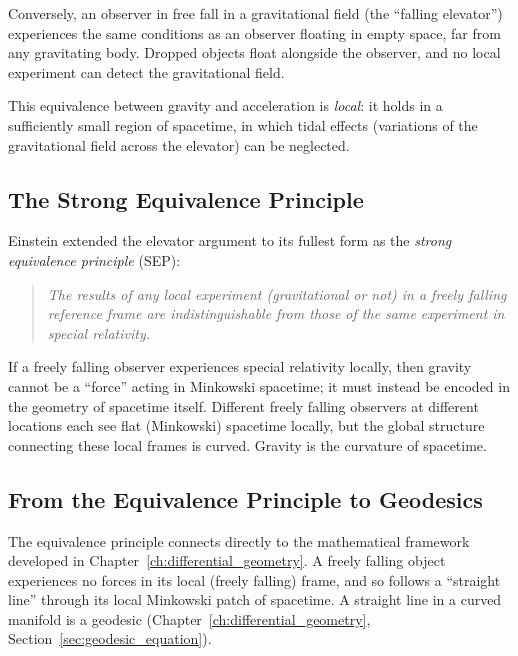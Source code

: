 \noindent
Conversely, an observer in free fall in a gravitational field
(the ``falling elevator'') experiences the same conditions as
an observer floating in empty space, far from any gravitating body.
Dropped objects float alongside the observer, and no local
experiment can detect the gravitational field.

This equivalence between gravity and acceleration is \emph{local}:
it holds in a sufficiently small region of spacetime, in which tidal
effects (variations of the gravitational field across the elevator)
can be neglected.

\subsection{The Strong Equivalence Principle}
\label{sec:strong_equivalence}

Einstein extended the elevator argument to its fullest form as the
\emph{strong equivalence principle} (SEP):

\begin{quote}
\textit{The results of any local experiment (gravitational or not) in
a freely falling reference frame are indistinguishable from those of
the same experiment in special relativity.}
\end{quote}

\noindent
If a freely falling observer
experiences special relativity locally, then gravity cannot be a
``force'' acting in Minkowski spacetime; it must instead be encoded
in the geometry of spacetime itself.  Different freely falling
observers at different locations each see flat (Minkowski) spacetime
locally, but the global structure connecting these local frames is
curved.  Gravity is the curvature of spacetime.

\subsection{From the Equivalence Principle to Geodesics}
\label{sec:ep_to_geodesics}

The equivalence principle connects directly to the mathematical
framework developed in Chapter~\ref{ch:differential_geometry}.  A freely falling object
experiences no forces in its local (freely falling) frame, and so
follows a ``straight line'' through its local Minkowski patch of
spacetime.  A straight line in a curved manifold is a
geodesic (Chapter~\ref{ch:differential_geometry}, Section~\ref{sec:geodesic_equation}).

